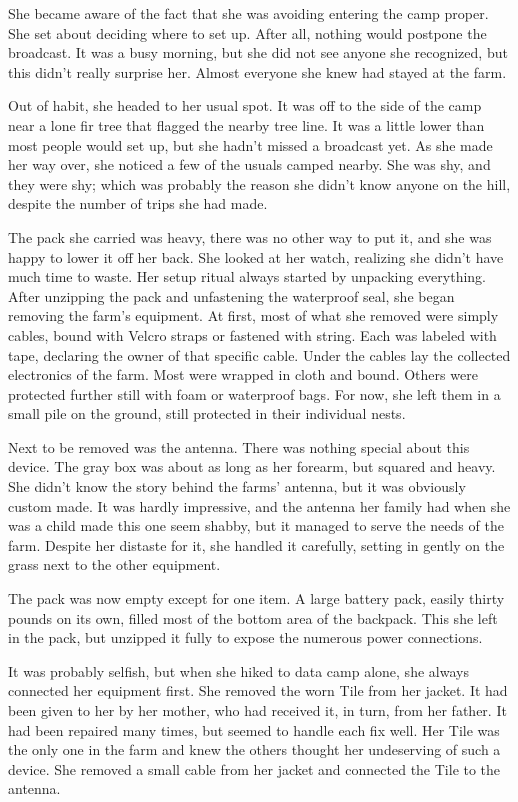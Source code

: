 \documentclass[courier]{sffms}
\begin{document}
She became aware of the fact that she was avoiding entering the
camp proper. She set about deciding where to set up. After all,
nothing would postpone the broadcast. It was a busy morning, but
she did not see anyone she recognized, but this didn't really
surprise her. Almost everyone she knew had stayed at the farm.

Out of habit, she headed to her usual spot. It was off to the
side of the camp near a lone fir tree that flagged the nearby
tree line. It was a little lower than most people would set up,
but she hadn't missed a broadcast yet. As she made her way over,
she noticed a few of the usuals camped nearby. She was shy, and
they were shy; which was probably the reason she didn't know
anyone on the hill, despite the number of trips she had made.

The pack she carried was heavy, there was no other way to put
it, and she was happy to lower it off her back. She looked at
her watch, realizing she didn't have much time to waste. Her
setup ritual always started by unpacking everything. After
unzipping the pack and unfastening the waterproof seal, she
began removing the farm's equipment. At first, most of what she
removed were simply cables, bound with Velcro straps or fastened
with string. Each was labeled with tape, declaring the owner of
that specific cable. Under the cables lay the collected
electronics of the farm. Most were wrapped in cloth and bound.
Others were protected further still with foam or waterproof
bags. For now, she left them in a small pile on the ground,
still protected in their individual nests.

Next to be removed was the antenna. There was nothing special
about this device. The gray box was about as long as her forearm,
but squared and heavy. She didn't know the story behind the
farms' antenna, but it was obviously custom made. It was hardly
impressive, and the antenna her family had when she was a child
made this one seem shabby, but it managed to serve the needs of
the farm. Despite her distaste for it, she handled it carefully,
setting in gently on the grass next to the other equipment.

The pack was now empty except for one item. A large battery
pack, easily thirty pounds on its own, filled most of the bottom
area of the backpack. This she left in the pack, but unzipped it
fully to expose the numerous power connections.

It was probably selfish, but when she hiked to data camp alone,
she always connected her equipment first. She removed the worn
Tile from her jacket. It had been given to her by her mother,
who had received it, in turn, from her father. It had been
repaired many times, but seemed to handle each fix well. Her
Tile was the only one in the farm and knew the others thought
her undeserving of such a device. She removed a small cable from
her jacket and connected the Tile to the antenna.
\end{document}
